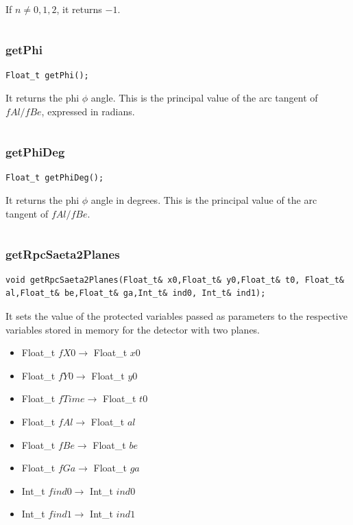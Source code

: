 \documentclass[a4paper]{book}
\begin{document}
If $n \neq 0, 1, 2$, it returns $-1$.

\[\]

\subsubsection{getPhi}

\begin{lstlisting}[style=customc]
Float_t getPhi();
\end{lstlisting}

It returns the phi $\phi$ angle. This is the principal value of the arc tangent of $fAl/fBe$, expressed in radians.

\[\]

\subsubsection{getPhiDeg}

\begin{lstlisting}[style=customc]
Float_t getPhiDeg();
\end{lstlisting}

It returns the phi $\phi$ angle in degrees. This is the principal value of the arc tangent of $fAl/fBe$.

\[\]

\subsubsection{getRpcSaeta2Planes}

\begin{lstlisting}[style=customc]
void getRpcSaeta2Planes(Float_t& x0,Float_t& y0,Float_t& t0, Float_t& al,Float_t& be,Float_t& ga,Int_t& ind0, Int_t& ind1);
\end{lstlisting}

It sets the value of the protected variables passed as parameters to the respective variables stored in memory for the detector with two planes.

\begin{itemize}
	\item Float\_t $fX0 \rightarrow$ Float\_t $x0$
	\item Float\_t $fY0 \rightarrow$ Float\_t $y0$
	\item Float\_t $fTime \rightarrow$ Float\_t $t0$
	\item Float\_t $fAl \rightarrow$ Float\_t $al$
	\item Float\_t $fBe \rightarrow$ Float\_t $be$
	\item Float\_t $fGa \rightarrow$ Float\_t $ga$
	\item Int\_t $find0 \rightarrow$ Int\_t $ind0$
	\item Int\_t $find1 \rightarrow$ Int\_t $ind1$
\end{itemize}
\end{document}
